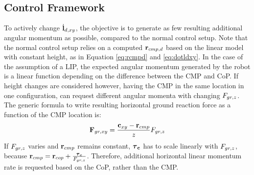 \subsection{Control Framework}
To actively change $\dot{\mathbf{l}}_{d,xy}$, the objective is to generate as few resulting additional angular momentum as possible, compared to the normal control setup. Note that the normal control setup relies on a computed $\mathbf{r}_{cmp,d}$ based on the linear model with constant height, as in Equation \eqref{eq:rcmpd} and \eqref{eq:dotldxy}. In the case of the assumption of a \ac{LIP}, the expected angular momentum generated by the robot is a linear function depending on the difference between the \ac{CMP} and \ac{CoP}. If height changes are considered however, having the \ac{CMP} in the same location in one configuration, can request different angular momenta with changing $F_{gr,z}$. The generic formula to write resulting horizontal ground reaction force as a function of the \ac{CMP}  location is:
\begin{equation}
\mathbf{F}_{gr,xy}=\frac{\mathbf{c}_{xy}-\mathbf{r}_{cmp}}{z}F_{gr,z}
\label{eq:fgrxygeneric}
\end{equation}
If $F_{gr,z}$ varies and $\mathbf{r}_{cmp}$ remains constant, $\boldsymbol{\tau}_{\mathbf{c}}$ has to scale linearly with $F_{gr,z}$, because $\mathbf{r}_{cmp} = \mathbf{r}_{cop} + \frac{\boldsymbol{\tau}_{\mathbf{c}}}{F_{gr,z}}$. Therefore, additional horizontal linear momentum rate is requested based on the \ac{CoP}, rather than the \ac{CMP}.
